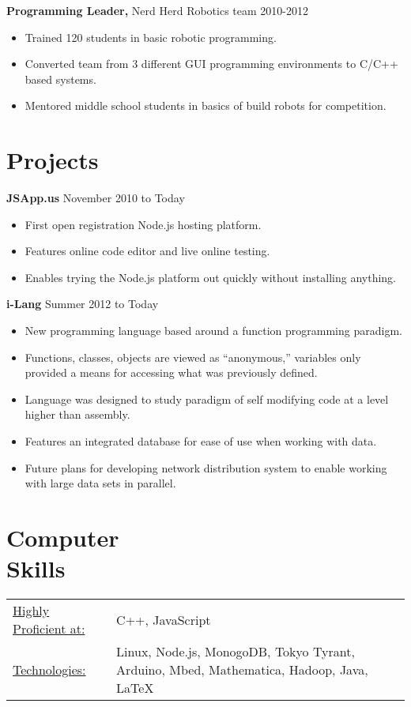 \documentclass[margin]{res}
\begin{document}
\begin{resume}
{\bf Programming Leader,} Nerd Herd Robotics team \hfill 2010-2012
\begin{itemize} \itemsep -2pt
  \item Trained 120 students in basic robotic programming.
  \item Converted team from 3 different GUI programming environments to C/C++ based systems. %
  \item Mentored middle school students in basics of build robots for competition.
\end{itemize}


\section{Projects}
{\bf JSApp.us} \hfill November 2010 to Today
\begin{itemize} \itemsep -2pt
  \item First open registration Node.js hosting platform.
  \item Features online code editor and live online testing.
  \item Enables trying the Node.js platform out quickly without installing anything.
\end{itemize}

{\bf i-Lang} \hfill Summer 2012 to Today
\begin{itemize} \itemsep -2pt
  \item New programming language based around a function programming paradigm.
  \item Functions, classes, objects are viewed as ``anonymous,'' variables only provided a means for accessing what was previously defined.
  \item Language was designed to study paradigm of self modifying code at a level higher than assembly.
  \item Features an integrated database for ease of use when working with data.
  \item Future plans for developing network distribution system to enable working with large data sets in parallel.
\end{itemize}

\section{Computer \\ Skills}
   \begin{tabular}{l p{3in}}
    \underline{Highly Proficient at:} & C++, JavaScript \\

     \underline{Technologies:} & Linux, Node.js, MonogoDB, Tokyo Tyrant, Arduino, Mbed, Mathematica, Hadoop, Java, \LaTeX
 \end{tabular}

\end{resume}
\end{document}
